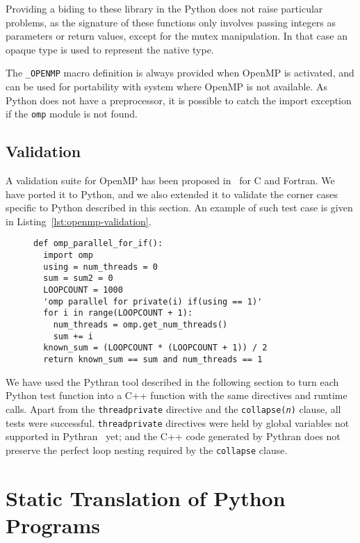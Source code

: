 \documentclass{llncs}
\begin{document}
Providing a biding to these library in the Python does not raise
particular problems, as the signature of these functions only involves passing
integers as parameters or return values, except for the mutex manipulation. In
that case an opaque type is used to represent the native type.

The \texttt{\_OPENMP} macro definition is always provided when OpenMP is
activated, and can be used for portability with system where OpenMP is not
available. As Python does not have a preprocessor, it is possible to catch the
import exception if the \texttt{omp} module is not found.

\subsection{Validation}

A validation suite for OpenMP has been proposed in~\cite{wang2012} for C and
Fortran. We have ported it to Python, and we also extended it to validate the
corner cases specific to Python described in this section. An example of such
test case is given in Listing~\ref{lst:openmp-validation}.

\begin{figure}
    \begin{lstlisting}[label={lst:openmp-validation},caption={Example of Python
    OpenMP validation test case.}]
def omp_parallel_for_if():
  import omp
  using = num_threads = 0
  sum = sum2 = 0
  LOOPCOUNT = 1000
  'omp parallel for private(i) if(using == 1)'
  for i in range(LOOPCOUNT + 1):
    num_threads = omp.get_num_threads()
    sum += i
  known_sum = (LOOPCOUNT * (LOOPCOUNT + 1)) / 2
  return known_sum == sum and num_threads == 1
    \end{lstlisting}
\end{figure}

We have used the Pythran tool described in the following section to turn each
Python test function into a C++ function with the same directives and runtime
calls. Apart from the \texttt{threadprivate} directive and the
\texttt{collapse(\emph{n})} clause, all tests were successful.
\texttt{threadprivate} directives were held by global variables not supported in
Pythran~ yet; and the C++ code generated by Pythran does not preserve the perfect
loop nesting required by the \texttt{collapse} clause.

\section{Static Translation of Python Programs}\label{sec:python-static}
\end{document}
